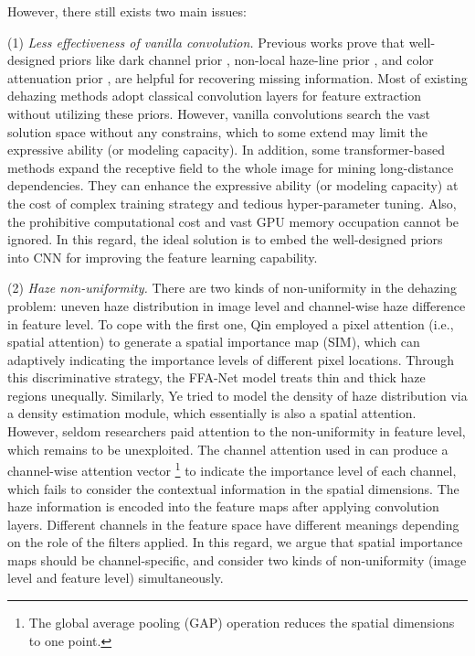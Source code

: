 \documentclass[lettersize,journal]{IEEEtran}
\begin{document}
However, there still exists two main issues:

(1) \emph{Less effectiveness of vanilla convolution.}
Previous works \cite{he2010TPAMI,berman2016CVPR,zhu2015TIP} prove that well-designed priors like dark channel prior \cite{He2009CVPR-DCP,he2010TPAMI}, non-local haze-line prior \cite{berman2016CVPR}, and color attenuation prior \cite{zhu2015TIP}, are helpful for recovering missing information.
Most of existing dehazing methods \cite{qin2020AAAI,Wu2020CVPRW,wu2021CVPR} adopt classical convolution layers for feature extraction without utilizing these priors. 
However, vanilla convolutions search the vast solution space without any constrains, which to some extend may limit the expressive ability (or modeling capacity).
In addition, some transformer-based methods \cite{guo2022CVPR} expand the receptive field to the whole image for mining long-distance dependencies.
They can enhance the expressive ability (or modeling capacity) at the cost of complex training strategy and tedious hyper-parameter tuning.
Also, the prohibitive computational cost and vast GPU memory occupation cannot be ignored. 
In this regard, the ideal solution is to embed the well-designed priors into CNN for improving the feature learning capability.

(2) \emph{Haze non-uniformity.}
There are two kinds of non-uniformity in the dehazing problem: uneven haze distribution in image level and channel-wise haze difference in feature level.
To cope with the first one, Qin \etal \cite{qin2020AAAI} employed a pixel attention (i.e., spatial attention) to generate a spatial importance map (SIM), which can adaptively indicating the importance levels of different pixel locations. 
Through this discriminative strategy, the FFA-Net model treats thin and thick haze regions unequally.
Similarly, Ye \etal \cite{ye2022ECCVORAL} tried to model the density of haze distribution via a density estimation module, which essentially is also a spatial attention.
However, seldom researchers paid attention to the non-uniformity in feature level, which remains to be unexploited.
The channel attention used in \cite{qin2020AAAI} can produce a channel-wise attention vector \footnote{The global average pooling (GAP) operation reduces the spatial dimensions to one point.} to indicate the importance level of each channel, which fails to consider the contextual information in the spatial dimensions.
The haze information is encoded into the feature maps after applying convolution layers.
Different channels in the feature space have different meanings depending on the role of the filters applied.
In this regard, we argue that spatial importance maps should be channel-specific, and consider two kinds of non-uniformity (image level and feature level) simultaneously.
\end{document}
